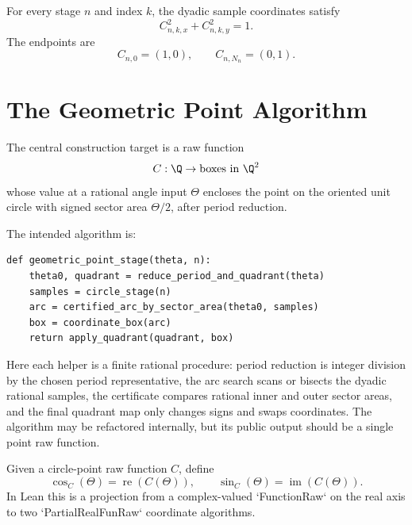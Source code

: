 \begin{theorem}
\label{thm:dyadic-trig-samples}
\leanok
For every stage \(n\) and index \(k\), the dyadic sample coordinates satisfy
\[
  C_{n,k,x}^2+C_{n,k,y}^2=1.
\]
The endpoints are
\[
  C_{n,0}=(1,0),
  \qquad
  C_{n,N_n}=(0,1).
\]
\end{theorem}

\section{The Geometric Point Algorithm}

\begin{definition}
\label{def:geometric-point-functionraw}
The central construction target is a raw function
\[
  C : \Q \to \hbox{boxes in }\Q^2
\]
whose value at a rational angle input \(\Theta\) encloses the point on the
oriented unit circle with signed sector area \(\Theta/2\), after period
reduction.

The intended algorithm is:
\begin{verbatim}
def geometric_point_stage(theta, n):
    theta0, quadrant = reduce_period_and_quadrant(theta)
    samples = circle_stage(n)
    arc = certified_arc_by_sector_area(theta0, samples)
    box = coordinate_box(arc)
    return apply_quadrant(quadrant, box)
\end{verbatim}
Here each helper is a finite rational procedure: period reduction is integer
division by the chosen period representative, the arc search scans or bisects
the dyadic rational samples, the certificate compares rational inner and outer
sector areas, and the final quadrant map only changes signs and swaps
coordinates.
The algorithm may be refactored internally, but its public output should be a
single point raw function.
\end{definition}

\begin{definition}
\label{def:geometric-sin-cos-functionraw}
\leanok
Given a circle-point raw function \(C\), define
\[
  \cos_C(\Theta)=\operatorname{re}(C(\Theta)),
  \qquad
  \sin_C(\Theta)=\operatorname{im}(C(\Theta)).
\]
In Lean this is a projection from a complex-valued `FunctionRaw` on the real
axis to two `PartialRealFunRaw` coordinate algorithms.
\end{definition}

